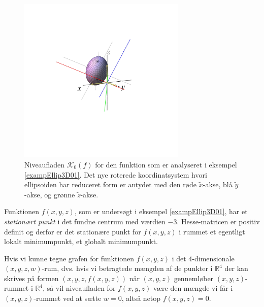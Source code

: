 \begin{figure}[ht]
\centerline{  \includegraphics[height=80mm]{FIGS/plotEllip3D01Kvad.pdf}}
\begin{center}
\caption{Niveaufladen $\mathcal{K}_{0}(f)$ for den funktion som er analyseret i eksempel \ref{exampEllip3D01}. Det nye roterede koordinatsystem hvori ellipsoiden har reduceret form er antydet med den røde $\widetilde{x}$-akse, blå $\widetilde{y}$-akse, og grønne $\widetilde{z}$-akse.} \label{figEllip3D01Kvad}
\end{center}
\end{figure}




\begin{think}
Funktionen $f(x,y,z)$, som er undersøgt i eksempel \ref{exampEllip3D01}, har et {\emph{stationært punkt}} i det fundne centrum med værdien $-3$. Hesse-matricen er positiv definit og derfor er det stationære punkt for $f(x,y,z)$ i rummet et egentligt lokalt minimumpunkt, et globalt minimumpunkt.
\end{think}

\begin{aha}
Hvis vi kunne tegne grafen for funktionen $f(x,y,z)$ i det $4$-dimensionale $(x,y,z,w)$-rum, dvs. hvis vi betragtede mængden af de punkter i $\mathbb{R}^{4}$ der kan skrives på formen $(x, y, z, f(x,y,z))$ når $(x,y,z)$ gennemløber $(x,y,z)$-rummet i $\mathbb{R}^{4}$, så vil niveaufladen for $f(x,y,z)$ være den mængde vi får i $(x,y,z)$-rummet  ved at sætte $w=0$, altså netop $f(x,y,z) = 0$.
\end{aha}












